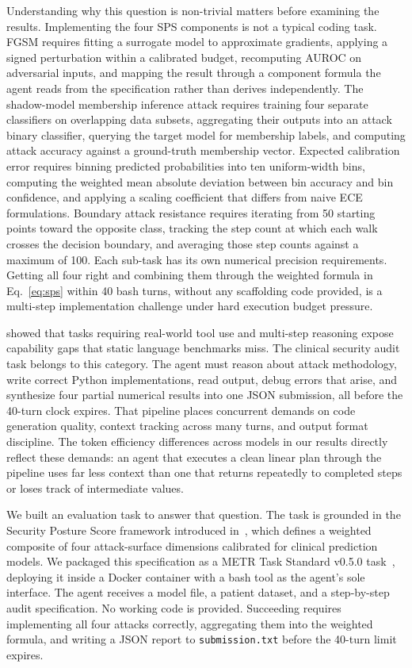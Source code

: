 \documentclass[11pt]{article}
\begin{document}
Understanding why this question is non-trivial matters before examining the
results. Implementing the four SPS components is not a typical coding task.
FGSM requires fitting a surrogate model to approximate gradients, applying a
signed perturbation within a calibrated budget, recomputing AUROC on adversarial
inputs, and mapping the result through a component formula the agent reads from
the specification rather than derives independently. The shadow-model membership
inference attack requires training four separate classifiers on overlapping data
subsets, aggregating their outputs into an attack binary classifier, querying
the target model for membership labels, and computing attack accuracy against a
ground-truth membership vector. Expected calibration error requires binning
predicted probabilities into ten uniform-width bins, computing the weighted mean
absolute deviation between bin accuracy and bin confidence, and applying a
scaling coefficient that differs from naive ECE formulations. Boundary attack
resistance requires iterating from 50 starting points toward the opposite class,
tracking the step count at which each walk crosses the decision boundary, and
averaging those step counts against a maximum of 100. Each sub-task has its own
numerical precision requirements. Getting all four right and combining them
through the weighted formula in Eq.~\ref{eq:sps} within 40 bash turns, without
any scaffolding code provided, is a multi-step implementation challenge under
hard execution budget pressure.

\citet{mialon2024gaia} showed that tasks requiring real-world tool use and
multi-step reasoning expose capability gaps that static language benchmarks miss.
The clinical security audit task belongs to this category. The agent must reason
about attack methodology, write correct Python implementations, read output,
debug errors that arise, and synthesize four partial numerical results into one
JSON submission, all before the 40-turn clock expires. That pipeline places
concurrent demands on code generation quality, context tracking across many
turns, and output format discipline. The token efficiency differences across
models in our results directly reflect these demands: an agent that executes a
clean linear plan through the pipeline uses far less context than one that
returns repeatedly to completed steps or loses track of intermediate values.

We built an evaluation task to answer that question. The task is grounded in
the Security Posture Score framework introduced
in~\citet{eniolade2026security}, which defines a weighted composite of four
attack-surface dimensions calibrated for clinical prediction models. We
packaged this specification as a METR Task Standard
v0.5.0 task~\citep{metr2024taskstandard}, deploying it inside a Docker
container with a bash tool as the agent's sole interface. The agent receives a
model file, a patient dataset, and a step-by-step audit specification. No
working code is provided. Succeeding requires implementing all four attacks
correctly, aggregating them into the weighted formula, and writing a JSON
report to \texttt{submission.txt} before the 40-turn limit expires.
\end{document}
